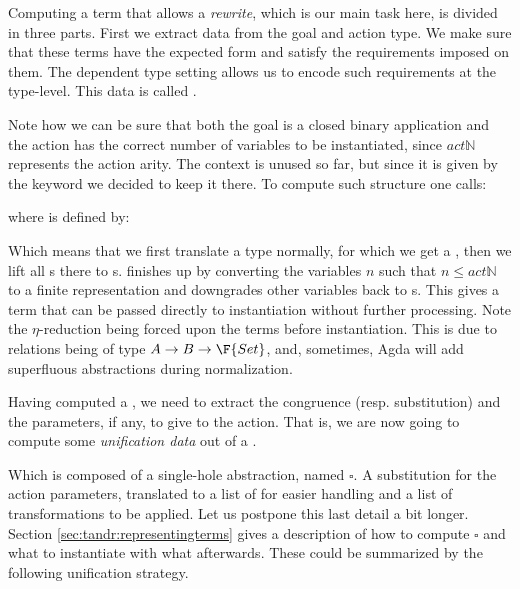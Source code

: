 Computing a term that allows a \emph{rewrite}, which is our main task here, is divided in three parts. First we extract data from the goal and action type. We
make sure that these terms have the expected form and satisfy the requirements
imposed on them. The dependent type setting allows us to encode such requirements
at the type-level. This data is called .


Note how we can be sure that both the goal is a closed binary application and the action has the correct number of variables to be instantiated, since $act\mathbb{N}$ represents the action arity. The context is unused so far, but since
it is given by the  keyword we decided to keep it there. To compute such structure one calls:


where  is defined by:


Which means that we first translate a type normally, for which we get a , then we lift all s there to s.  finishes up by converting the variables $n$ such that $n \le act\mathbb{N}$ to a finite
representation and downgrades other variables back to s. This
gives a term that can be passed directly to instantiation without further processing.
Note the $\eta$-reduction being forced upon the terms before instantiation. This is due
to relations being of type $A \rightarrow B \rightarrow \F{Set}$, and, sometimes, Agda
will add superfluous abstractions during normalization. 

Having computed a , we need to extract the congruence (resp. substitution) and the parameters, if any, to give to the action. That is, we are now going to compute some \emph{unification data} out of a .


Which is composed of a single-hole abstraction, named $\square$. A substitution
for the action parameters, translated to a list of  for easier handling and a list of transformations to be applied. Let us postpone this last detail a bit longer. Section \ref{sec:tandr:representingterms} gives a description of how to compute $\square$ and what to instantiate with what afterwards. These could be summarized by the
following unification strategy.

